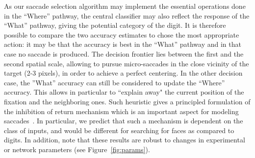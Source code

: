 As our saccade selection algorithm may implement the essential operations done in the ``Where'' pathway, the central classifier may also reflect the response of the ``What'' pathway,
giving the potential category of the digit. %
It is therefore possible to compare the two accuracy estimates to chose the most appropriate action: it may be that the  accuracy is best in the ``What'' pathway and in that case no saccade is produced.
The decision frontier lies between the first and the second spatial scale, allowing to pursue micro-saccades in the close vicinity of the target (2-3 pixels), in order to achieve a perfect centering.
In the other decision case, the ''What'' accuracy can still be considered to update the ``Where'' accuracy.
This allows in particular to ``explain away" the current position of the fixation and the neighboring ones.
Such heuristic gives a principled formulation of the inhibition of return mechanism which is an important aspect for modeling saccades~\citep{Itti01}. In particular, we predict that such a mechanism is dependent on the class of inputs, and would be different for searching for faces as compared to digits.
\fi
{}\ICANN
In addition, note that these results are robust to changes in experimental or network parameters (see Figure~\ref{fig:params}).
\else
